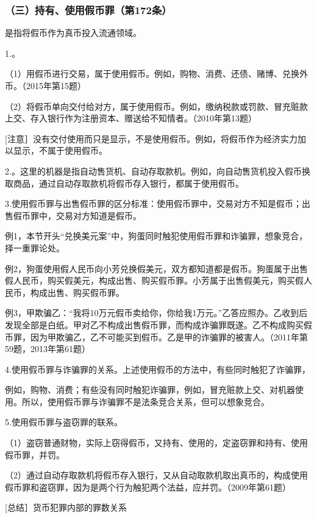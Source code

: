 \subsubsection*{（三）持有、使用假币罪（第172条）}

是指将假币作为真币投入流通领域。

1.。

（1）用假币进行交易，属于使用假币。例如，购物、消费、还债、赌博、兑换外币。（2015年第15题）

（2）将假币单向交付给对方，属于使用假币。例如，缴纳税款或罚款、冒充赃款上交、存入银行作为注册资本、赠送给不知情者。（2010年第13题）

[注意］没有交付使用而只是显示，不是使用假币。例如，将假币作为经济实力加以显示，不属于使用假币。

2.。这里的机器是指自动售货机、自动存取款机。例如，向自动售货机投入假币换取商品，通过自动存取款机将假币存入银行，都属于使用假币。

3.使用假币罪与出售假币罪的区分标准：使用假币罪中，交易对方不知是假币；出售假币罪中，交易对方知道是假币。

例1，本节开头“兑换美元案”中，狗蛋同时触犯使用假币罪和诈骗罪，想象竞合，择一重罪论处。

例2，狗蛋使用假人民币向小芳兑换假美元，双方都知道都是假币。狗蛋属于出售假人民币，购买假美元，构成出售、购买假币罪。小芳属于出售假美元，购买假人民币，构成出售、购买假币罪。

例3，甲欺骗乙：“我将10万元假币卖给你，你给我1万元。”乙答应照办。乙收到后发现全部是白纸。甲对乙不构成出售假币罪，而构成诈骗罪既遂。乙不构成购买假币罪，因为甲欺骗乙，乙不可能买到假币。乙是甲的诈骗罪的被害人。（2011年第59题，2013年第61题）

4.使用假币罪与诈骗罪的关系。上述使用假币的方法中，有些同时触犯了诈骗罪，

例如，购物、消费；有些没有同时触犯诈骗罪，例如，冒充赃款上交、对机器使用。所以，使用假币罪与诈骗罪不是法条竞合关系，但可以想象竞合。

5.使用假币罪与盗窃罪的联系。

（1）盗窃普通财物，实际上窃得假币，又持有、使用的，定盗窃罪和持有、使用假币罪，并罚。

（2）通过自动存取款机将假币存入银行，又从自动取款机取出真币的，构成使用假币罪和盗窃罪，因为是两个行为触犯两个法益，应并罚。（2009年第61题）

[总结］货币犯罪内部的罪数关系

